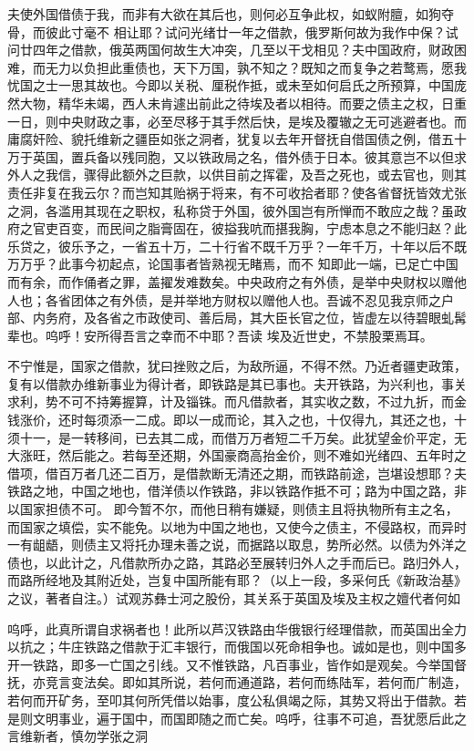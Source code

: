 \documentclass{article}
\begin{document}
夫使外国借债于我，而非有大欲在其后也，则何必互争此权，如蚁附膻，如狗夺骨，而彼此寸毫不
\newpage
相让耶？试问光绪廿一年之借款，俄罗斯何故为我作中保？试问廿四年之借款，俄英两国何故生大冲突，几至以干戈相见？夫中国政府，财政困难，而无力以负担此重债也，天下万国，孰不知之？既知之而复争之若鹜焉，愿我忧国之士一思其故也。今即以关税、厘税作抵，或未至如何启氏之所预算，中国庞然大物，精华未竭，西人未肯遽出前此之待埃及者以相待。而要之债主之权，日重一日，则中央财政之事，必至尽移于其手然后快，是埃及覆辙之无可逃避者也。而庸腐奸险、貌托维新之疆臣如张之洞者，犹复以去年开督抚自借国债之例，借五十万于英国，置兵备以残同胞，又以铁政局之名，借外债于日本。彼其意岂不以但求外人之我信，骤得此额外之巨款，以供目前之挥霍，及吾之死也，或去官也，则其责任非复在我云尔？而岂知其贻祸于将来，有不可收拾者耶？使各省督抚皆效尤张之洞，各滥用其现在之职权，私称贷于外国，彼外国岂有所惮而不敢应之哉？虽政府之官吏百变，而民间之脂膏固在，彼搤我吭而揕我胸，宁虑本息之不能归赵？此乐贷之，彼乐予之，一省五十万，二十行省不既千万乎？一年千万，十年以后不既万万乎？此事今初起点，论国事者皆熟视无睹焉，而不
\newpage
知即此一端，已足亡中国而有余，而作俑者之罪，盖擢发难数矣。中央政府之有外债，是举中央财权以赠他人也；各省团体之有外债，是并举地方财权以赠他人也。吾诚不忍见我京师之户部、内务府，及各省之市政使司、善后局，其大臣长官之位，皆虚左以待碧眼虬髯辈也。呜呼！安所得吾言之幸而不中耶？吾读
埃及近世史，不禁股栗焉耳。 

不宁惟是，国家之借款，犹曰挫败之后，为敌所逼，不得不然。乃近者疆吏政策，复有以借款办维新事业为得计者，即铁路是其已事也。夫开铁路，为兴利也，事关求利，势不可不持筹握算，计及锱铢。而凡借款者，其实收之数，不过九折，而金钱涨价，还时每须添一二成。即以一成而论，其入之也，十仅得九，其还之也，十须十一，是一转移间，已去其二成，而借万万者短二千万矣。此犹望金价平定，无大涨旺，然后能之。若每至还期，外国豪商高抬金价，则不难如光绪四、五年时之借项，借百万者几还二百万，是借款断无清还之期，而铁路前途，岂堪设想耶？夫铁路之地，中国之地也，借洋债以作铁路，非以铁路作抵不可；路为中国之路，非以国家担债不可。
\newpage
即今暂不尔，而他日稍有嫌疑，则债主且将执物所有主之名，而国家之填偿，实不能免。以地为中国之地也，又使今之债主，不侵路权，而异时一有龃龉，则债主又将托办理未善之说，而据路以取息，势所必然。以债为外洋之债也，以此计之，凡借款所办之路，其路必至展转归外人之手而后已。路归外人，而路所经地及其附近处，岂复中国所能有耶？（以上一段，多采何氏《新政治基》之议，著者自注。）试观苏彝士河之股份，其关系于英国及埃及主权之嬗代者何如

呜呼，此真所谓自求祸者也！此所以芦汉铁路由华俄银行经理借款，而英国出全力以抗之；牛庄铁路之借款于汇丰银行，而俄国以死命相争也。诚如是也，则中国多开一铁路，即多一亡国之引线。又不惟铁路，凡百事业，皆作如是观矣。今举国督抚，亦竞言变法矣。即如其所说，若何而通道路，若何而练陆军，若何而广制造，若何而开矿务，至叩其何所凭借以始事，度公私俱竭之际，其势又将出于借款。若是则文明事业，遍于国中，而国即随之而亡矣。呜呼，往事不可追，吾犹愿后此之言维新者，慎勿学张之洞
\end{document}
